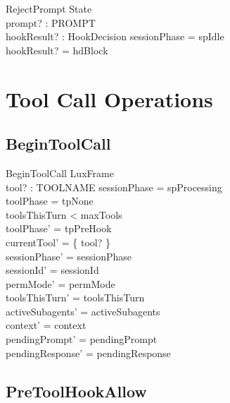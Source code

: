 \documentclass[a4paper,10pt,fleqn]{article}
\begin{document}
\begin{schema}{RejectPrompt}
  \Xi State \\
  prompt? : PROMPT \\
  hookResult? : HookDecision
  \where
  sessionPhase = spIdle \\
  hookResult? = hdBlock
\end{schema}

\section{Tool Call Operations}

\subsection{BeginToolCall}

\begin{schema}{BeginToolCall}
  LuxFrame \\
  tool? : TOOLNAME
  \where
  sessionPhase = spProcessing \\
  toolPhase = tpNone \\
  toolsThisTurn < maxTools \\
  toolPhase' = tpPreHook \\
  currentTool' = \{ tool? \} \\
  sessionPhase' = sessionPhase \\
  sessionId' = sessionId \\
  permMode' = permMode \\
  toolsThisTurn' = toolsThisTurn \\
  activeSubagents' = activeSubagents \\
  context' = context \\
  pendingPrompt' = pendingPrompt \\
  pendingResponse' = pendingResponse
\end{schema}

\subsection{PreToolHookAllow}
\end{document}
